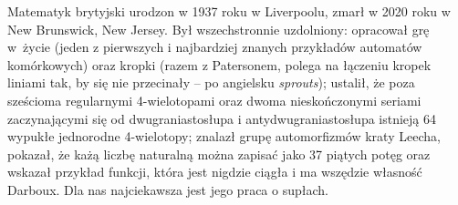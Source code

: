 \begin{remark}
    Matematyk brytyjski urodzon w 1937 roku w Liverpoolu, zmarł w 2020 roku w New Brunswick, New Jersey.
    Był wszechstronnie uzdolniony: opracował grę w~życie (jeden z pierwszych i najbardziej znanych przykładów automatów komórkowych) oraz kropki (razem z Patersonem, polega na łączeniu kropek liniami tak, by się nie przecinały -- po angielsku \emph{sprouts}); ustalił, że poza sześcioma regularnymi 4-wielotopami oraz dwoma nieskończonymi seriami zaczynającymi się od dwugraniastosłupa i antydwugraniastosłupa istnieją 64 wypukłe jednorodne 4-wielotopy; znalazł grupę automorfizmów kraty Leecha, pokazał, że każą liczbę naturalną można zapisać jako 37 piątych potęg oraz wskazał przykład funkcji, która jest nigdzie ciągła i ma wszędzie własność Darboux.
    Dla nas najciekawsza jest jego praca \cite{conway1970} o supłach.
\end{remark}


